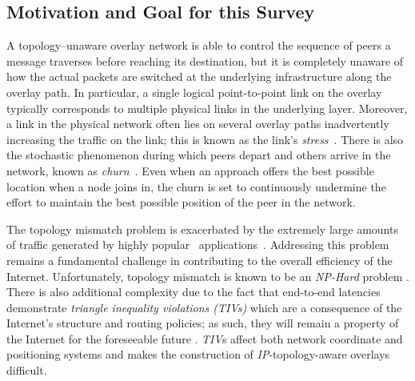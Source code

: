 \subsection{Motivation and Goal for this Survey}
A topology--unaware overlay network is able to control the sequence of peers a
message traverses before reaching its destination, but it is completely unaware
of how the actual packets are switched at the underlying infrastructure along
the overlay path. 
In particular, a single logical point-to-point link on the
overlay typically corresponds to multiple physical links in the
underlying layer. 
Moreover, a link in the physical network often lies
on several overlay paths inadvertently increasing the traffic on the
link; this is known as the link's \emph{stress}~\cite{CRSZ2002}. 
There is also the stochastic phenomenon during which peers 
depart and others arrive in the network, known 
as \emph{churn}~\cite{stutzbach_churn_2006}.
Even when an approach offers the best possible location
when a node joins in, the churn is set to  
continuously undermine the effort to maintain the best possible position
of the  peer in the network.

The topology mismatch problem is exacerbated by the extremely large amounts of
traffic generated by highly popular \p\ applications~\cite{byl-book}.
Addressing this problem remains a fundamental challenge 
in contributing to the overall efficiency of the Internet. 
Unfortunately, topology mismatch is known to be 
an \emph{NP-Hard} problem \cite{C2000,NPBOOK}. 
There is also additional complexity due to the fact that 
end-to-end latencies demonstrate \emph{triangle inequality
violations (TIVs)} which are a consequence of the Internet's structure and
routing policies; as such, they will remain a property of the Internet 
for the foreseeable future \cite{zheng_irprtt_2005}. 
\emph{TIV}s affect both network coordinate
\cite{cox_vivaldi_2004,wong_meridian_2005} and positioning \cite{ng_gnp_2001}
systems and makes the construction of \emph{IP}-topology-aware 
overlays difficult.


